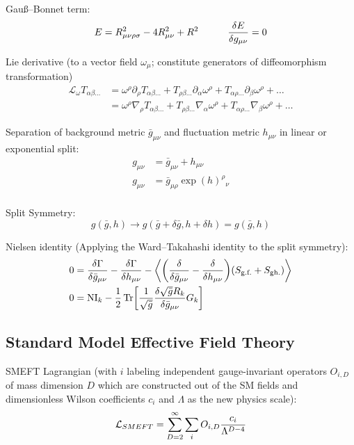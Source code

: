 		\noindent
		Gauß--Bonnet term:
		\begin{equation}
			E = R_{\mu\nu\rho\sigma}^2 - 4 R_{\mu\nu}^2 + R^2
			\hsp \fdv{E}{g_{\mu\nu}} = 0
		\end{equation}

		\noindent
		Lie derivative (\wrt to a vector field $\omega_\mu$; constitute generators of diffeomorphism transformation)
		\begin{equation}
			\begin{aligned}
				\mathcal{L}_\omega T_{\alpha\beta\dots} 
				&= \omega^\rho \partial_\rho T_{\alpha\beta\dots} + T_{\rho\beta\dots} \partial_\alpha \omega^\rho + T_{\alpha\rho\dots} \partial_\beta \omega^\rho + \dots \\
				&= \omega^\rho \nabla_\rho T_{\alpha\beta\dots} + T_{\rho\beta\dots} \nabla_\alpha \omega^\rho + T_{\alpha\rho\dots} \nabla_\beta \omega^\rho + \dots
			\end{aligned}
		\end{equation}

		\noindent
		Separation of background metric $\bar{g}_{\mu\nu}$ and fluctuation metric $h_{\mu\nu}$ in linear or exponential split:
		\begin{align}
			g_{\mu\nu} &= \bar{g}_{\mu\nu} + h_{\mu\nu} \\
			g_{\mu\nu} &= \bar{g}_{\mu\rho}\exp(h)^\rho{}_{\nu} \\
		\end{align}

		\noindent
		Split Symmetry:
		\begin{equation}
			g(\bar{g},h) \to g(\bar{g}+\delta \bar{g}, h + \delta h) = g(\bar{g},h)
		\end{equation}

		\noindent
		Nielsen identity (Applying the Ward--Takahashi identity to the split symmetry):
		\begin{align}
			0 &= \fdv{\Gamma}{\bar{g}_{\mu\nu}} - \fdv{\Gamma}{h_{\mu\nu}} - \Avg{\qty(\fdv{\bar{g}_{\mu\nu}} - \fdv{h_{\mu\nu}})(S_\text{g.f.} + S_\text{gh.})} \\
			0 &= \mathrm{NI}_k - \frac{1}{2} \tr[\frac{1}{\sqrt{\bar{g}}} \fdv{\sqrt{\bar{g}}R_k}{\bar{g}_{\mu\nu}}G_k]
		\end{align}

	\subsection{Standard Model Effective Field Theory}
		SMEFT Lagrangian (with $i$ labeling independent gauge-invariant operators $O_{i,D}$ of mass dimension $D$ which are constructed out of the SM fields and dimensionless Wilson coefficients $c_i$ and $\Lambda$ as the new physics scale):
		\begin{equation}
			\mathcal{L}_{SMEFT} = \sum_{D=2}^{\infty} \sum_{i} O_{i,D} \frac{c_i}{\Lambda^{D-4}}
		\end{equation}